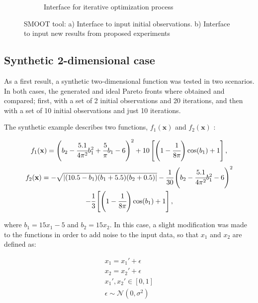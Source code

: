 \documentclass{article}
\begin{document}
\begin{figure}
\begin{subfigure}{0.45\textwidth}
        \caption{Interface for iterative optimization process}
        \label{tool_2}
    \end{subfigure}
\caption{SMOOT tool: a) Interface to input initial observations. b) Interface to input new results from proposed experiments}
\label{tool}
\end{figure}

\subsection{Synthetic 2-dimensional case}

As a first result, a synthetic two-dimensional function was tested in two scenarios. In both cases, the generated and ideal Pareto fronts where obtained and compared; first, with a set of 2 initial observations and 20 iterations, and then with a set of 10 initial observations and just 10 iterations.

The synthetic example describes two functions, $f_1(\textbf{x})$ and $f_2(\textbf{x})$ \cite{parr2013improvement}:

\begin{equation}\label{f1}
    f_1(\textbf{x}) = \left( b_2 - \cfrac{5.1}{4\pi^2}b_1^2 + \cfrac{5}{\pi}b_1 - 6 \right)^2 + 10\left[ \left( 1 - \cfrac{1}{8\pi} \right)\cos(b_1) + 1 \right],
\end{equation}
\begin{multline}\label{f2}
    f_2(\textbf{x}) = - \sqrt{|(10.5-b_1)(b_1+5.5)(b_2+0.5)|} - \cfrac{1}{30}\left( b_2 - \cfrac{5.1}{4\pi^2}b_1^2 - 6 \right)^2\\ - \cfrac{1}{3}\left[ \left( 1 - \cfrac{1}{8\pi} \right)\cos(b_1) + 1 \right],
\end{multline}

where $b_1 = 15x_1 - 5$ and $b_2 = 15x_2$. In this case, a slight modification was made to the functions in order to add noise to the input data, so that $x_1$ and $x_2$ are defined as:

\begin{align*}
    x_1 = x_1' + \epsilon\\
    x_2 = x_2' + \epsilon\\
    x_1', x_2' \in \left[0,1\right]\\
    \epsilon \sim \mathcal{N}(0,\sigma^2)
\end{align*}
\end{document}

